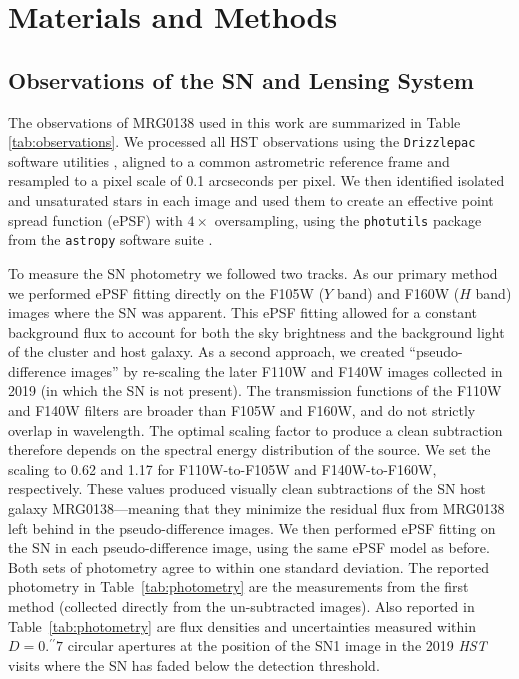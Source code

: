 \documentclass[12pt]{article}
\begin{document}
{\section*{Materials and Methods}


\subsection*{Observations of the SN and Lensing System}

The observations of MRG0138 used in this work are  summarized in Table \ref{tab:observations}.   We processed all HST observations using the {\tt Drizzlepac} software utilities \cite{gonzaga_drizzlepac_2012}, aligned to a common astrometric reference frame and resampled to a pixel scale of 0.1 arcseconds per pixel.  We then identified isolated and unsaturated stars in each image and used them to create an effective point spread function (ePSF) with $4\times$ oversampling, using the {\tt photutils} package from the {\tt astropy} software suite \cite{the_astropy_collaboration_astropy_2018}.   

To measure the SN photometry we followed two tracks.  As our primary method we performed ePSF fitting directly on the F105W ($Y$ band) and F160W ($H$ band) images where the SN was apparent.  This ePSF fitting allowed for a constant background flux to account for both the sky brightness and the background light of the cluster and host galaxy.  
As a second approach, we created ``pseudo-difference images'' by re-scaling the later F110W and F140W images collected in 2019 (in which the SN is not present).  The transmission functions of the F110W and F140W filters are broader than F105W and F160W, and do not strictly overlap in wavelength.  The optimal scaling factor to produce a clean subtraction therefore depends on the spectral energy distribution of the source.  We set the scaling to 0.62 and 1.17 for F110W-to-F105W and F140W-to-F160W, respectively.  These values produced visually clean subtractions of the SN host galaxy MRG0138---meaning that they minimize the residual flux from MRG0138 left behind in the pseudo-difference images.  We then performed ePSF fitting on the SN in each pseudo-difference image, using the same ePSF model as before.   Both sets of photometry agree to within one standard deviation.  The reported photometry in Table~\ref{tab:photometry} are the measurements from the first method (collected directly from the un-subtracted images).  Also reported in Table~\ref{tab:photometry} are flux densities and uncertainties measured within $D=0.^{\prime\prime}7$ circular apertures at the position of the SN1 image in the 2019 \textit{HST} visits where the SN has faded below the detection threshold.

}
\end{document}

